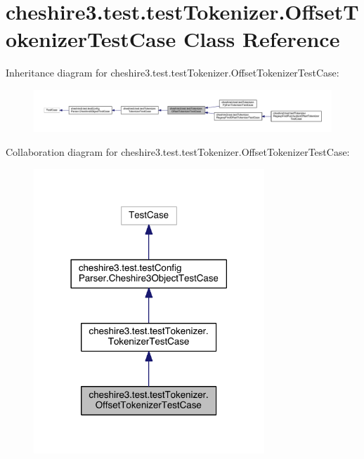 \hypertarget{classcheshire3_1_1test_1_1test_tokenizer_1_1_offset_tokenizer_test_case}{\section{cheshire3.\-test.\-test\-Tokenizer.\-Offset\-Tokenizer\-Test\-Case Class Reference}
\label{classcheshire3_1_1test_1_1test_tokenizer_1_1_offset_tokenizer_test_case}
}


Inheritance diagram for cheshire3.\-test.\-test\-Tokenizer.\-Offset\-Tokenizer\-Test\-Case\-:
\nopagebreak
\begin{figure}[H]
\begin{center}
\leavevmode
\includegraphics[width=350pt]{classcheshire3_1_1test_1_1test_tokenizer_1_1_offset_tokenizer_test_case__inherit__graph}
\end{center}
\end{figure}


Collaboration diagram for cheshire3.\-test.\-test\-Tokenizer.\-Offset\-Tokenizer\-Test\-Case\-:
\nopagebreak
\begin{figure}[H]
\begin{center}
\leavevmode
\includegraphics[width=246pt]{classcheshire3_1_1test_1_1test_tokenizer_1_1_offset_tokenizer_test_case__coll__graph}
\end{center}
\end{figure}
